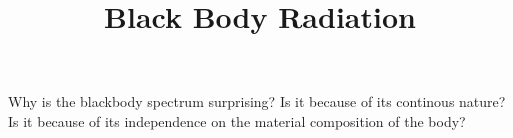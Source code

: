 \documentclass{../template/texnote}
\title{Black Body Radiation}
\begin{document}
    \maketitle {}

Why is the blackbody spectrum surprising?
Is it because of its continous nature? Is it because of its independence on the material composition of the body?

    \printbibliography
\end{document}

